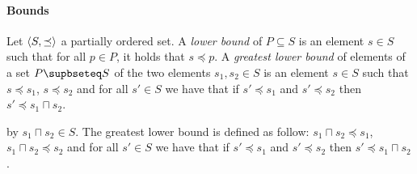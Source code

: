 \documentclass[letterpaper]{article}
\DeclarePairedDelimiter{\tuple}{\langle}{\rangle}
\theoremstyle{definition}
\begin{document}
\paragraph{Bounds} Let $\tuple{S, \preceq}$ a partially ordered set.
A \textit{lower bound} of $P \subseteq S$ is an element $s \in S$
such that for all $p \in P$, it holds that $s \preceq p$.
A \textit{greatest lower bound} of elements of a set $P \supbseteq S$
of the two elements $s_1,
s_2 \in S$ is an element $s \in S$ such that
$s \preceq s_1$,
$s \preceq s_2$ and for all $s' \in S$ we have that
if $s' \preceq s_1$ and $s' \preceq s_2$ then $s' \preceq s_1 \sqcap s_2$.


by $s_1 \sqcap s_2 \in S$.
The greatest lower bound is defined as follow:
$s_1 \sqcap s_2 \preceq s_1$,
$s_1 \sqcap s_2 \preceq s_2$ and for all $s' \in S$ we have that
if $s' \preceq s_1$ and $s' \preceq s_2$ then $s' \preceq s_1 \sqcap s_2$.

\end{document}
